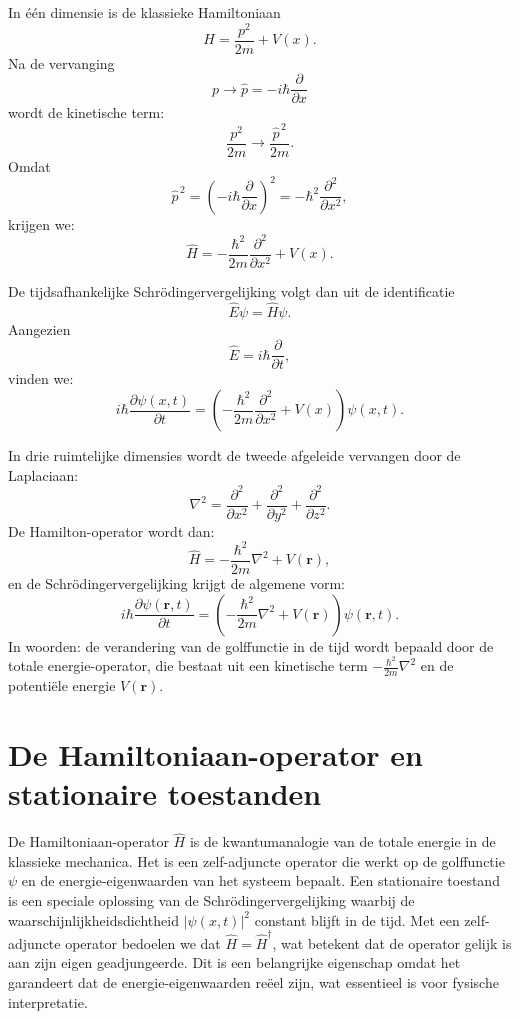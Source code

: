 \documentclass{report} %
\begin{document}
    In één dimensie is de klassieke Hamiltoniaan
    \[
        H=\frac{p^2}{2m}+V(x).
    \]
    Na de vervanging
    \[
        p \longrightarrow \hat{p}=-i\hbar\frac{\partial}{\partial x}
    \]
    wordt de kinetische term:
    \[
        \frac{p^2}{2m}
        \longrightarrow
        \frac{\hat{p}^{\,2}}{2m}.
    \]
    Omdat
    \[
        \hat{p}^{\,2}
        =
        \left(-i\hbar\frac{\partial}{\partial x}\right)^2
        =
        -\hbar^2\frac{\partial^2}{\partial x^2},
    \]
    krijgen we:
    \[
        \hat{H}
        =
        -\frac{\hbar^2}{2m}\frac{\partial^2}{\partial x^2}
        +
        V(x).
    \]

    De tijdsafhankelijke Schrödingervergelijking volgt dan uit de identificatie
    \[
        \hat{E}\psi=\hat{H}\psi.
    \]
    Aangezien
    \[
        \hat{E}=i\hbar\frac{\partial}{\partial t},
    \]
    vinden we:
    \[
        i\hbar\frac{\partial \psi(x,t)}{\partial t}
        =
        \left(
            -\frac{\hbar^2}{2m}\frac{\partial^2}{\partial x^2}
            +
            V(x)
        \right)\psi(x,t).
    \]

    In drie ruimtelijke dimensies wordt de tweede afgeleide vervangen door de
    Laplaciaan:
    \[
        \nabla^2
        =
        \frac{\partial^2}{\partial x^2}
        +
        \frac{\partial^2}{\partial y^2}
        +
        \frac{\partial^2}{\partial z^2}.
    \]
    De Hamilton-operator wordt dan:
    \[
        \hat{H}
        =
        -\frac{\hbar^2}{2m}\nabla^2
        +
        V(\mathbf{r}),
    \]
    en de Schrödingervergelijking krijgt de algemene vorm:
    \[
        i\hbar\frac{\partial \psi(\mathbf{r},t)}{\partial t}
        =
        \left(
            -\frac{\hbar^2}{2m}\nabla^2
        +
        V(\mathbf{r})
        \right)\psi(\mathbf{r},t).
    \]
    In woorden: de verandering van de golffunctie in de tijd wordt bepaald door de
    totale energie-operator, die bestaat uit een kinetische term
    $-\frac{\hbar^2}{2m}\nabla^2$ en de potenti\"ele energie $V(\mathbf{r})$.


    \section{De Hamiltoniaan-operator en stationaire toestanden}
    De Hamiltoniaan-operator $\hat{H}$ is de kwantumanalogie van de totale energie in de klassieke mechanica.
    Het is een zelf-adjuncte operator die werkt op de golffunctie $\psi$ en de energie-eigenwaarden van het systeem bepaalt.
    Een stationaire toestand is een speciale oplossing van de Schrödingervergelijking waarbij
    de waarschijnlijkheidsdichtheid $|\psi(x,t)|^2$ constant blijft in de tijd.
    Met een zelf-adjuncte operator bedoelen we dat $\hat{H} = \hat{H}^\dagger$, wat betekent dat de operator gelijk is aan zijn eigen geadjungeerde.
    Dit is een belangrijke eigenschap omdat het garandeert dat de energie-eigenwaarden reëel zijn, wat essentieel is voor fysische interpretatie.
\end{document}

